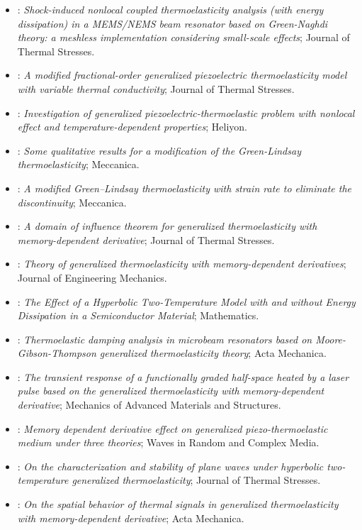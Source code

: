 \begin{itemize}
\item \citet{Hosseini2017}: \emph{Shock-induced nonlocal coupled thermoelasticity analysis (with energy dissipation) in a MEMS/NEMS beam resonator based on Green-Naghdi theory: a meshless implementation considering small-scale effects}; Journal of Thermal Stresses.
\item \citet{Guo2018}: \emph{A modified fractional-order generalized piezoelectric thermoelasticity model with variable thermal conductivity}; Journal of Thermal Stresses.
\item \citet{Li2018}: \emph{Investigation of generalized piezoelectric-thermoelastic problem with nonlocal effect and temperature-dependent properties}; Heliyon.
\item \citet{Quintanilla2018}: \emph{Some qualitative results for a modification of the Green-Lindsay thermoelasticity}; Meccanica.
\item \citet{Yu2018ModifiedGL}: \emph{A modified Green--Lindsay thermoelasticity with strain rate to eliminate the discontinuity}; Meccanica.
\item \citet{Sarkar2019a}: \emph{A domain of influence theorem for generalized thermoelasticity with memory-dependent derivative}; Journal of Thermal Stresses.
\item \citet{Shaw2019}: \emph{Theory of generalized thermoelasticity with memory-dependent derivatives}; Journal of Engineering Mechanics.
\item \citet{Alzahrani2020}: \emph{The Effect of a Hyperbolic Two-Temperature Model with and without Energy Dissipation in a Semiconductor Material}; Mathematics.
\item \citet{Kumar2020a}: \emph{Thermoelastic damping analysis in microbeam resonators based on Moore-Gibson-Thompson generalized thermoelasticity theory}; Acta Mechanica.
\item \citet{Li2020}: \emph{The transient response of a functionally graded half-space heated by a laser pulse based on the generalized thermoelasticity with memory-dependent derivative}; Mechanics of Advanced Materials and Structures.
\item \citet{Mondal2020}: \emph{Memory dependent derivative effect on generalized piezo-thermoelastic medium under three theories}; Waves in Random and Complex Media.
\item \citet{Prasad2020}: \emph{On the characterization and stability of plane waves under hyperbolic two-temperature generalized thermoelasticity}; Journal of Thermal Stresses.
\item \citet{Sarkar2020}: \emph{On the spatial behavior of thermal signals in generalized thermoelasticity with memory-dependent derivative}; Acta Mechanica.

\end{itemize}
